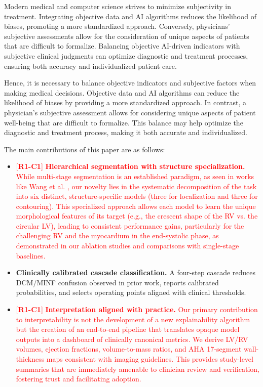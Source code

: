 \documentclass[fleqn,10pt]{wlscirep}
\newcommand{\revtag}[2]{[\textbf{R#1-C#2}]}
\newcommand{\Rone}[1]{\textcolor{red}{#1}}
\begin{document}
Modern medical and computer science strives to minimize subjectivity in treatment. Integrating objective data and AI algorithms reduces the likelihood of biases, promoting a more standardized approach. Conversely, physicians' subjective assessments allow for the consideration of unique aspects of patients that are difficult to formalize. Balancing objective AI-driven indicators with subjective clinical judgments can optimize diagnostic and treatment processes, ensuring both accuracy and individualized patient care.

Hence, it is necessary to balance objective indicators and subjective factors when making medical decisions. Objective data and AI algorithms can reduce the likelihood of biases by providing a more standardized approach. In contrast, a physician's subjective assessment allows for considering unique aspects of patient well-being that are difficult to formalize. This balance may help optimize the diagnostic and treatment process, making it both accurate and individualized.

The main contributions of this paper are as follows:
\begin{itemize}
    \item \Rone{\revtag{1}{1} \textbf{Hierarchical segmentation with structure specialization.} While multi-stage segmentation is an established paradigm, as seen in works like Wang et al. \cite{Wang:2023b}, our novelty lies in the systematic decomposition of the task into six distinct, structure-specific models (three for localization and three for contouring). This specialized approach allows each model to learn the unique morphological features of its target (e.g., the crescent shape of the RV vs. the circular LV), leading to consistent performance gains, particularly for the challenging RV and the myocardium in the end-systolic phase, as demonstrated in our ablation studies and comparisons with single-stage baselines\cite{Ronneberger:2015,Hu:2023,daSilva:2024}.}
    \item \textbf{Clinically calibrated cascade classification.} A four-step cascade reduces DCM/MINF confusion observed in prior work\cite{Isensee:2018,Khened:2019,Zheng:2019}, reports calibrated probabilities, and selects operating points aligned with clinical thresholds.
    \item \Rone{\revtag{1}{1} \textbf{Interpretation aligned with practice.} Our primary contribution to interpretability is not the development of a new explainability algorithm but the creation of an end-to-end pipeline that translates opaque model outputs into a dashboard of clinically canonical metrics. We derive LV/RV volumes, ejection fractions, volume-to-mass ratios, and AHA 17-segment wall-thickness maps consistent with imaging guidelines\cite{Szabo:2022,Watanabe:2022}. This provides study-level summaries that are immediately amenable to clinician review and verification, fostering trust and facilitating adoption.}
\end{itemize}
\end{document}
